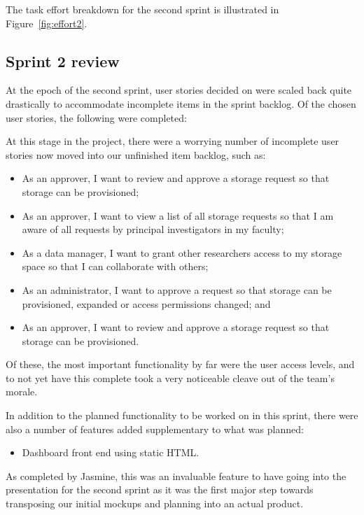 \documentclass[a4paper,titlepage,12pt]{article}
\begin{document}
The task effort breakdown for the second sprint is illustrated in
Figure~\ref{fig:effort2}.

\subsection{Sprint 2 review}

At the epoch of the second sprint, user stories decided on were scaled back
quite drastically to accommodate incomplete items in the sprint backlog. Of the
chosen user stories, the following were completed:

At this stage in the project, there were a worrying number of incomplete user
stories now moved into our unfinished item backlog, such as:

\begin{itemize}
	\item As an approver, I want to review and approve a storage request so
	      that storage can be provisioned;
	\item As an approver, I want to view a list of all storage requests so
	      that I am aware of all requests by principal investigators in my
	      faculty;
	\item As a data manager, I want to grant other researchers access to my
	      storage space so that I can collaborate with others;
	\item As an administrator, I want to approve a request so that storage
	      can be provisioned, expanded or access permissions changed; and
	\item As an approver, I want to review and approve a storage request so
	      that storage can be provisioned.
\end{itemize}

Of these, the most important functionality by far were the user access levels,
and to not yet have this complete took a very noticeable cleave out of the
team's morale.

In addition to the planned functionality to be worked on in this sprint, there
were also a number of features added supplementary to what was planned:

\begin{itemize}
	\item Dashboard front end using static HTML.
\end{itemize}

As completed by Jasmine, this was an invaluable feature to have going into the
presentation for the second sprint as it was the first major step towards
transposing our initial mockups and planning into an actual product.
\end{document}
